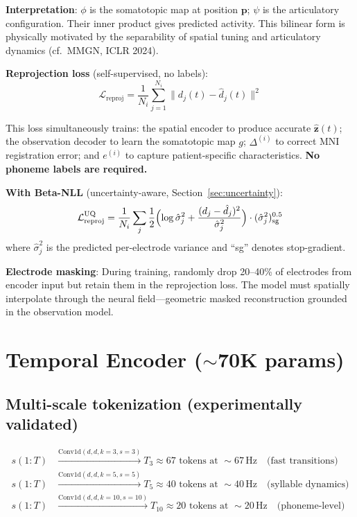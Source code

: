 \documentclass[11pt,letterpaper]{article}
\newcommand{\bfp}{\mathbf{p}}
\newcommand{\bfz}{\mathbf{z}}
\begin{document}
\textbf{Interpretation}: $\phi$ is the somatotopic map at position $\bfp$; $\psi$ is the articulatory configuration. Their inner product gives predicted activity. This bilinear form is physically motivated by the separability of spatial tuning and articulatory dynamics (cf.\ MMGN, ICLR 2024).

\textbf{Reprojection loss} (self-supervised, no labels):
\begin{equation}\label{eq:reproj}
\mathcal{L}_{\text{reproj}} = \frac{1}{N_i} \sum_{j=1}^{N_i} \bigl\| d_j(t) - \hat{d}_j(t) \bigr\|^2
\end{equation}

This loss simultaneously trains: the spatial encoder to produce accurate $\hat{\bfz}(t)$; the observation decoder to learn the somatotopic map $g$; $\Delta^{(i)}$ to correct MNI registration error; and $e^{(i)}$ to capture patient-specific characteristics. \textbf{No phoneme labels are required.}

\textbf{With Beta-NLL} (uncertainty-aware, Section~\ref{sec:uncertainty}):
\begin{equation}
\mathcal{L}_{\text{reproj}}^{\text{UQ}} = \frac{1}{N_i} \sum_{j} \frac{1}{2}\Bigl(\log \hat{\sigma}_j^2 + \frac{(d_j - \hat{d}_j)^2}{\hat{\sigma}_j^2}\Bigr) \cdot (\hat{\sigma}_j^2)^{0.5}_{\text{sg}}
\end{equation}
where $\hat{\sigma}_j^2$ is the predicted per-electrode variance and ``sg'' denotes stop-gradient.

\textbf{Electrode masking}: During training, randomly drop 20--40\% of electrodes from encoder input but retain them in the reprojection loss. The model must spatially interpolate through the neural field---geometric masked reconstruction grounded in the observation model.


\section{Temporal Encoder (${\sim}$70K params)}

\subsection{Multi-scale tokenization (experimentally validated)}

\begin{equation}
\begin{aligned}
s(1{:}T) &\xrightarrow{\text{Conv1d}(d,d,k{=}3,s{=}3)} T_3 \approx 67 \text{ tokens at } {\sim}67\,\text{Hz} \quad \text{(fast transitions)}\\
s(1{:}T) &\xrightarrow{\text{Conv1d}(d,d,k{=}5,s{=}5)} T_5 \approx 40 \text{ tokens at } {\sim}40\,\text{Hz} \quad \text{(syllable dynamics)}\\
s(1{:}T) &\xrightarrow{\text{Conv1d}(d,d,k{=}10,s{=}10)} T_{10} \approx 20 \text{ tokens at } {\sim}20\,\text{Hz} \quad \text{(phoneme-level)}
\end{aligned}
\end{equation}
\end{document}
